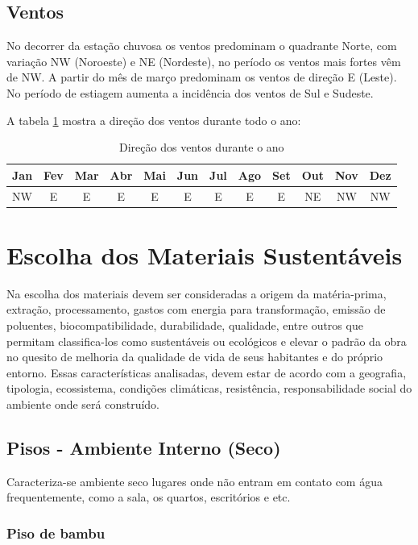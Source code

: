 \subsection{Ventos}

	No decorrer da estação chuvosa os ventos predominam o quadrante Norte, com variação NW (Noroeste)  e NE (Nordeste), no período os ventos mais fortes vêm de NW. A partir do mês de março predominam os ventos de direção E (Leste). No período de estiagem aumenta a incidência dos ventos de Sul e Sudeste.

	A tabela \ref{direcao_ventos}\cite{2015Instituto} mostra a direção dos ventos durante todo o ano:

\begin{table}[H]
\begin{tabular}{|c|c|c|c|c|c|c|c|c|c|c|c|}
\hline 
Jan & Fev & Mar & Abr & Mai & Jun & Jul & Ago & Set & Out & Nov & Dez\tabularnewline
\hline 
\hline 
NW & E & E & E & E & E & E & E & E & NE & NW & NW\tabularnewline
\hline 
\end{tabular}
\caption{Direção dos ventos durante o ano}
\label{direcao_ventos}
\end{table}

\section{Escolha dos Materiais Sustentáveis}

	Na escolha dos materiais devem ser consideradas a origem da matéria-prima, extração, processamento, gastos com energia para transformação, emissão de poluentes, biocompatibilidade, durabilidade, qualidade, entre outros que permitam classifica-los como sustentáveis ou ecológicos e elevar o padrão da obra no quesito de melhoria da qualidade de vida de seus habitantes e do próprio entorno. Essas características analisadas, devem estar de acordo com a geografia, tipologia, ecossistema, condições climáticas, resistência, responsabilidade social do ambiente onde será construído.

\subsection{Pisos - Ambiente Interno (Seco)}
	
	Caracteriza-se ambiente seco lugares onde não entram em contato com água frequentemente, como a sala, os quartos, escritórios e etc.

\subsubsection*{\textbf{Piso de bambu}}

